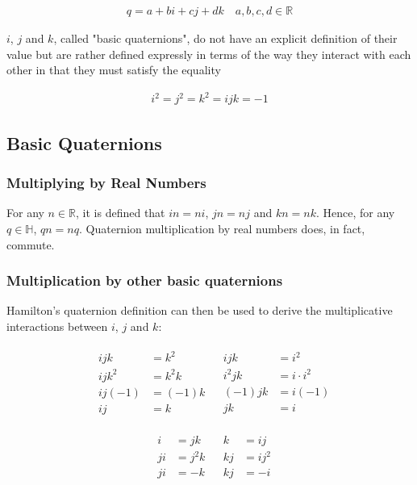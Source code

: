 \documentclass[12pt, a4paper]{article}
\begin{document}
\begin{align*}
    q = a + bi + cj + dk \quad a, b, c, d \in \mathbb{R}
\end{align*}

$i$, $j$ and $k$, called "basic quaternions", do not have an explicit definition
of their value but are rather defined expressly in terms of the way they
interact with each other in that they must satisfy the equality

\begin{align*}
    i^2 = j^2 = k^2 = ijk = -1
\end{align*}

\subsection{Basic Quaternions}

\subsubsection{Multiplying by Real Numbers}
For any $n \in \mathbb{R}$, it is defined that $in = ni$, $jn = nj$ and $kn =
    nk$. Hence, for any $q \in \mathbb{H}$, $qn = nq$. Quaternion multiplication by
real numbers does, in fact, commute.

\subsubsection{Multiplication by other basic quaternions}
Hamilton's quaternion definition can then be used to derive the multiplicative
interactions between $i$, $j$ and $k$:

\begin{align*}
     &
    \begin{aligned}
        ijk    & = k^2   \\
        ijk^2  & = k^2k  \\
        ij(-1) & = (-1)k \\
        ij     & = k
    \end{aligned}
     &
    \begin{aligned}
        ijk    & = i^2         \\
        i^2 jk & = i \cdot i^2 \\
        (-1)jk & = i(-1)       \\
        jk     & = i
    \end{aligned}
\end{align*}

\begin{align*}
     &
    \begin{aligned}
        i  & = jk   \\
        ji & = j^2k \\
        ji & = -k
    \end{aligned}
     &
    \begin{aligned}
        k  & = ij   \\
        kj & = ij^2 \\
        kj & = -i
    \end{aligned}
\end{align*}
\end{document}

